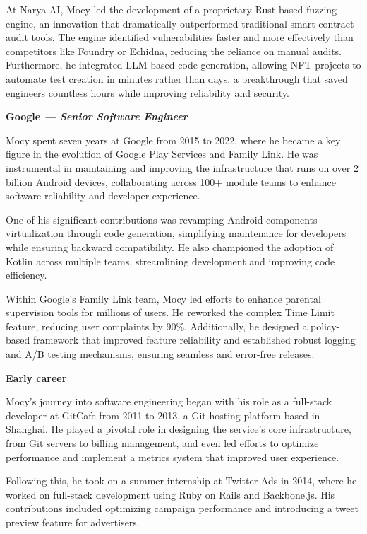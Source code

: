 \documentclass[]{friggeri-cv}
\begin{document}
At Narya AI, Mocy led the development of a proprietary Rust-based fuzzing engine,
an innovation that dramatically outperformed traditional smart contract audit tools.
The engine identified vulnerabilities faster and more effectively than competitors like Foundry or Echidna,
reducing the reliance on manual audits. 
Furthermore, he integrated LLM-based code generation, 
allowing NFT projects to automate test creation in minutes rather than days, 
a breakthrough that saved engineers countless hours while improving reliability and security.

\textbf{Google \emph{--- Senior Software Engineer}}

Mocy spent seven years at Google from 2015 to 2022, 
where he became a key figure in the evolution of Google Play Services and Family Link. 
He was instrumental in maintaining and improving the infrastructure that runs on over 2 billion Android devices, 
collaborating across 100+ module teams to enhance software reliability and developer experience.

One of his significant contributions was revamping Android components virtualization through code generation, 
simplifying maintenance for developers while ensuring backward compatibility. 
He also championed the adoption of Kotlin across multiple teams, 
streamlining development and improving code efficiency.

Within Google's Family Link team, Mocy led efforts to enhance parental supervision tools for millions of users.
He reworked the complex Time Limit feature, reducing user complaints by 90\%. 
Additionally, he designed a policy-based framework that improved feature reliability 
and established robust logging and A/B testing mechanisms, ensuring seamless and error-free releases.

\textbf{Early career}

Mocy's journey into software engineering began with his role as a full-stack developer at GitCafe from 2011 to 2013,
a Git hosting platform based in Shanghai. 
He played a pivotal role in designing the service's core infrastructure,
from Git servers to billing management, and even led efforts to optimize performance and 
implement a metrics system that improved user experience. 

Following this, he took on a summer internship at Twitter Ads in 2014, 
where he worked on full-stack development using Ruby on Rails and Backbone.js. 
His contributions included optimizing campaign performance and introducing a tweet preview feature for advertisers.
\end{document}
